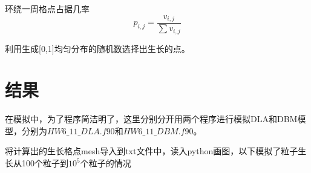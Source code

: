 \documentclass{article}
\begin{document}
环绕一周格点占据几率
\begin{equation}
	p_{i,j}=\frac{v_{i,j}}{\sum v_{i,j}}
\end{equation}


利用生成[0,1]均匀分布的随机数选择出生长的点。
	\section{结果}
	在模拟中，为了程序简洁明了，这里分别分开用两个程序进行模拟DLA和DBM模型，分别为$HW6\_11\_DLA.f90  $和$ HW6\_11\_DBM.f90 $。
	
	
将计算出的生长格点mesh导入到txt文件中，读入python画图，以下模拟了粒子生长从100个粒子到$ 10^5 $个粒子的情况


 \begin{figure}[!h]
	\centering
	

\end{figure}
\end{document}
